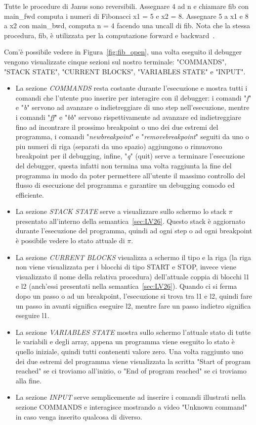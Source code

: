 \documentclass{article}
\theoremstyle{plain}
\theoremstyle{definition}
\theoremstyle{plain}
\begin{document}
Tutte le procedure di Janus sono reversibili. Assegnare 4 ad n e chiamare fib con main\_fwd computa i numeri di Fibonacci x1 = 5 e x2 = 8. Assegnare 5 a x1 e 8 a x2 con main\_bwd, computa n = 4 facendo una uncall di fib. Nota che la stessa procedura, fib, è utilizzata per la computazione forward e backward~\cite{JanusSem}.\bigskip

Com'è possibile vedere in Figura~\ref{fig:fib_open}, una volta eseguito il debugger vengono visualizzate cinque sezioni sul nostro terminale: "COMMANDS", "STACK STATE", "CURRENT BLOCKS", "VARIABLES STATE" e "INPUT".
\begin{itemize}
\item La sezione \emph{COMMANDS} resta costante durante l'esecuzione e mostra tutti i comandi che l'utente puo inserire per interagire con il debugger: i comandi "\emph{f}" e "\emph{b}" servono ad avanzare o indietreggiare di uno step nell'esecuzione, mentre i comandi "\emph{ff}" e "\emph{bb}" servono rispettivamente ad avanzare ed indietreggiare fino ad incontrare il prossimo breakpoint o uno dei due estremi del programma, i comandi "\emph{newbreakpoint}" e "\emph{removebreakpoint}" seguiti da uno o piu numeri di riga (separati da uno spazio) aggiungono o rimuovono breakpoint per il debugging, infine, "\emph{q}" (quit) serve a terminare l'esecuzione del debugger, questa infatti non termina una volta raggiunta la fine del programma in modo da poter permettere all'utente il massimo controllo del flusso di esecuzione del programma e garantire un debugging comodo ed efficiente.
\item La sezione \emph{STACK STATE} serve a visualizzare sullo schermo lo stack $\pi$ presentato all'interno della semantica~\ref{sec:LV26}. Questo stack è aggiornato durante l'esecuzione del programma, quindi ad ogni step o ad ogni breakpoint è possibile vedere lo stato attuale di $\pi$.
\item La sezione \emph{CURRENT BLOCKS} visualizza a schermo il tipo e la riga (la riga non viene visualizzata per i blocchi di tipo START e STOP, invece viene visualizzato il nome della relativa procedura) dell'attuale coppia di blocchi l1 e l2 (anch'essi presentati nella semantica~\ref{sec:LV26}). Quando ci si ferma dopo un passo o ad un breakpoint, l'esecuzione si trova tra l1 e l2, quindi fare un passo in avanti significa eseguire l2, mentre fare un passo indietro significa eseguire l1.
\item La sezione \emph{VARIABLES STATE} mostra sullo schermo l'attuale stato di tutte le variabili e degli array, appena un programma viene eseguito lo stato è quello iniziale, quindi tutti contenenti valore zero. Una volta raggiunto uno dei due estremi del programma viene visualizzata la scritta "Start of program reached" se ci troviamo all'inizio, o "End of program reached" se ci troviamo alla fine.
\item La sezione \emph{INPUT} serve semplicemente ad inserire i comandi illustrati nella sezione COMMANDS e interagisce mostrando a video "Unknown command" in caso venga inserito qualcosa di diverso.
\end{itemize}
\end{document}
